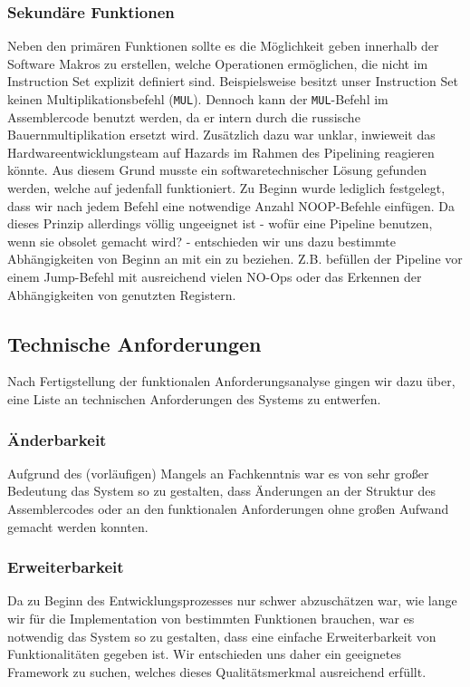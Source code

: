 \documentclass[paper=a4,fontsize=12pt,twocolumn]{scrreprt}
\begin{document}
\subsubsection{Sekundäre Funktionen}
Neben den primären Funktionen sollte es die Möglichkeit geben innerhalb der Software Makros zu erstellen, welche Operationen ermöglichen, die nicht im Instruction Set explizit definiert sind. Beispielsweise besitzt unser Instruction Set keinen Multiplikationsbefehl (\texttt{MUL}).
Dennoch kann der \texttt{MUL}-Befehl im Assemblercode benutzt werden, da er intern durch die russische Bauernmultiplikation ersetzt wird.
Zusätzlich dazu war unklar, inwieweit das Hardwareentwicklungsteam auf Hazards im Rahmen des Pipelining reagieren könnte. Aus diesem Grund musste ein softwaretechnischer Lösung  gefunden werden, welche auf jedenfall funktioniert.
Zu Beginn wurde lediglich festgelegt, dass wir nach jedem Befehl eine notwendige Anzahl NOOP-Befehle einfügen.
Da dieses Prinzip allerdings völlig ungeeignet ist - wofür eine Pipeline benutzen, wenn sie obsolet gemacht wird? - entschieden wir uns dazu bestimmte Abhängigkeiten von Beginn an mit ein zu beziehen.
Z.B. befüllen der Pipeline vor einem Jump-Befehl mit ausreichend vielen NO-Ops oder das Erkennen der Abhängigkeiten von genutzten Registern.

\subsection{Technische Anforderungen}
Nach Fertigstellung der funktionalen Anforderungsanalyse gingen wir dazu über, eine Liste an technischen Anforderungen des Systems zu entwerfen.

\subsubsection{Änderbarkeit}
Aufgrund des (vorläufigen) Mangels an Fachkenntnis war es von sehr großer Bedeutung das System so zu gestalten, dass Änderungen an der Struktur des Assemblercodes oder an den funktionalen Anforderungen ohne großen Aufwand gemacht werden konnten.

\subsubsection{Erweiterbarkeit}
Da zu Beginn des Entwicklungsprozesses nur schwer abzuschätzen war, wie lange wir für die Implementation von bestimmten Funktionen brauchen, war es notwendig das System so zu gestalten, dass eine einfache Erweiterbarkeit von Funktionalitäten gegeben ist. Wir entschieden uns daher ein geeignetes Framework zu suchen, welches dieses Qualitätsmerkmal ausreichend erfüllt. 
\end{document}
